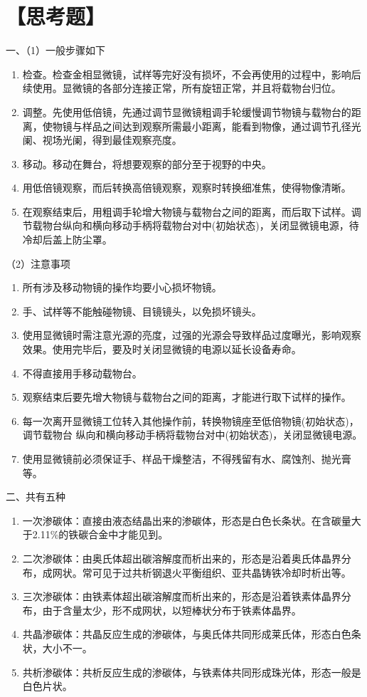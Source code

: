\documentclass[a4paper,utf8]{article}
\begin{document}
\section*{【思考题】}
一、（1）一般步骤如下
    \begin{enumerate}
        \item 检查。检查金相显微镜，试样等完好没有损坏，不会再使用的过程中，影响后续使用。显微镜的各部分连接正常，所有旋钮正常，并且将载物台归位。
        \item 调整。先使用低倍镜，先通过调节显微镜粗调手轮缓慢调节物镜与载物台的距离，使物镜与样品之间达到观察所需最小距离，能看到物像，通过调节孔径光阑、视场光阑，得到最佳观察亮度。
        \item 移动。移动在舞台，将想要观察的部分至于视野的中央。
        \item 用低倍镜观察，而后转换高倍镜观察，观察时转换细准焦，使得物像清晰。
        \item 在观察结束后，用粗调手轮增大物镜与载物台之间的距离，而后取下试样。调节载物台纵向和横向移动手柄将载物台对中(初始状态)，关闭显微镜电源，待冷却后盖上防尘罩。
    \end{enumerate}

    （2）注意事项
    \begin{enumerate}
        \item 所有涉及移动物镜的操作均要小心损坏物镜。
        \item 手、试样等不能触碰物镜、目镜镜头，以免损坏镜头。
        \item 使用显微镜时需注意光源的亮度，过强的光源会导致样品过度曝光，影响观察效果。使用完毕后，要及时关闭显微镜的电源以延长设备寿命。
        \item 不得直接用手移动载物台。
        \item 观察结束后要先增大物镜与载物台之间的距离，才能进行取下试样的操作。
        \item 每一次离开显微镜工位转入其他操作前，转换物镜座至低倍物镜(初始状态)，调节载物台
        纵向和横向移动手柄将载物台对中(初始状态)，关闭显微镜电源。
        \item 使用显微镜前必须保证手、样品干燥整洁，不得残留有水、腐蚀剂、抛光膏等。    
    \end{enumerate}  

二、共有五种

\begin{enumerate}
    \item 一次渗碳体：直接由液态结晶出来的渗碳体，形态是白色长条状。在含碳量大于2.11\%的铁碳合金中才能见到。
    \item 二次渗碳体：由奥氏体超出碳溶解度而析出来的，形态是沿着奥氏体晶界分布，成网状。常可见于过共析钢退火平衡组织、亚共晶铸铁冷却时析出等。
    \item 三次渗碳体：由铁素体超出碳溶解度而析出来的，形态是沿着铁素体晶界分布，由于含量太少，形不成网状，以短棒状分布于铁素体晶界。
    \item 共晶渗碳体：共晶反应生成的渗碳体，与奥氏体共同形成莱氏体，形态白色条状，大小不一。
    \item 共析渗碳体：共析反应生成的渗碳体，与铁素体共同形成珠光体，形态一般是白色片状。
\end{enumerate}
\end{document}
